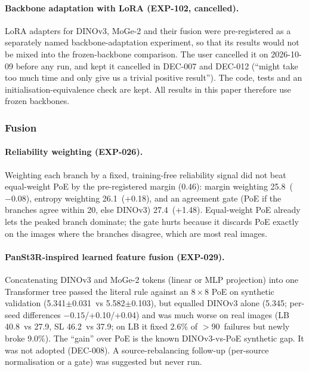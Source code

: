 \paragraph{Backbone adaptation with LoRA (EXP-102, cancelled).}
LoRA adapters for DINOv3, MoGe-2 and their fusion were pre-registered as a separately named backbone-adaptation experiment, so that its results would not be mixed into the frozen-backbone comparison. The user cancelled it on 2026-10-09 before any run, and kept it cancelled in DEC-007 and DEC-012 (``might take too much time and only give us a trivial positive result''). The code, tests and an initialisation-equivalence check are kept. All results in this paper therefore use frozen backbones.

\subsubsection{Fusion}\label{app:log_neg_fusion}

\paragraph{Reliability weighting (EXP-026).}
Weighting each branch by a fixed, training-free reliability signal did not beat equal-weight PoE by the pre-registered margin (0.46\appDdeg): margin weighting 25.8\appDdeg\ ($-0.08$), entropy weighting 26.1\appDdeg\ (+0.18), and an agreement gate (PoE if the branches agree within 20\appDdeg, else DINOv3) 27.4\appDdeg\ (+1.48). Equal-weight PoE already lets the peaked branch dominate; the gate hurts because it discards PoE exactly on the images where the branches disagree, which are most real images.

\paragraph{PanSt3R-inspired learned feature fusion (EXP-029).}
Concatenating DINOv3 and MoGe-2 tokens (linear or MLP projection) into one Transformer tree passed the literal rule against an $8\times8$ PoE on synthetic validation (5.341$\pm$0.031\appDdeg\ vs 5.582$\pm$0.103\appDdeg), but equalled DINOv3 alone (5.345\appDdeg; per-seed differences $-0.15$/+0.10/+0.04\appDdeg) and was much worse on real images (LB 40.8\appDdeg\ vs 27.9\appDdeg, SL 46.2\appDdeg\ vs 37.9\appDdeg; on LB it fixed 2.6\% of $>$90\appDdeg\ failures but newly broke 9.0\%). The ``gain'' over PoE is the known DINOv3-vs-PoE synthetic gap. It was not adopted (DEC-008). A source-rebalancing follow-up (per-source normalisation or a gate) was suggested but never run.

